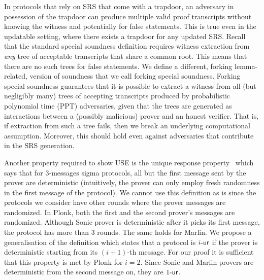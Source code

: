 In protocols that rely on SRS that come with a trapdoor, an adversary in
possession of the trapdoor can produce multiple valid proof transcripts without
knowing the witness and potentially for false statements. This is true even in
the updatable setting, where there exists a trapdoor for any updated SRS. Recall
that the standard special soundness definition requires witness extraction from
\emph{any} tree of acceptable transcripts that share a common root. This means
that there are no such trees for false statements. We define a different,
forking lemma-related, version of soundness that we call forking special soundness.
Forking special soundness guarantees that it is possible to extract a witness from all
(but negligibly many) trees of accepting transcripts produced by probabilistic
polynomial time (PPT) adversaries, given that the trees are generated as
interactions between a (possibly malicious) prover and an honest verifier. That
is, if extraction from such a tree fails, then we break an underlying
computational assumption. Moreover, this should hold even against adversaries
that contribute in the SRS generation.

  Another property required to
show USE is the unique response property~\cite{C:Fischlin05} which says that for $3$-messages
sigma protocols, all but the first message sent by the prover are deterministic (intuitively,
the prover can only employ fresh randomness in the first message of the protocol). We cannot
use this definition as is since the protocols we consider have other rounds where the prover
messages are randomized. In Plonk, both the first and the second prover's messages are
randomized. Although Sonic prover is deterministic after it picks its first message, the
protocol has more than $3$ rounds. The same holds for Marlin. We propose a generalisation of
the definition which states that a protocol is ${i\text{-}\mathsf{ur}}$ if the prover is deterministic starting
from its $(i + 1)$-th message. For our proof it is sufficient that this property is met by
Plonk for $i = 2$. Since Sonic and Marlin provers are deterministic from the second message on,
they are ${1\text{-}\mathsf{ur}}$.


